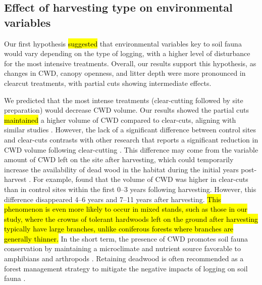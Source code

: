 \subsection*{Effect of harvesting type on environmental variables}
\label{disc:env_var}

Our first hypothesis \hl{suggested} that environmental variables key to soil fauna would vary depending on the type of logging, with a higher level of disturbance for the most intensive treatments. 
Overall, our results support this hypothesis, as changes in CWD, canopy openness, and litter depth were more pronounced in clearcut treatments, with partial cuts showing intermediate effects. 

We predicted that the most intense treatments (clear-cutting followed by site preparation) would decrease CWD volume. 
Our results showed the partial cuts \hl{maintained} a higher volume of CWD compared to clear-cuts, aligning with similar studies \citep{Nolet2018Comparingeffects,Ochs2022Responseterrestrial}. 
However, the lack of a significant difference between control sites and clear-cuts contrasts with other research that reports a significant reduction in CWD volume following clear-cutting \citep{Farnell2020effectsvariable}. 
This difference may come from the variable amount of CWD left on the site after harvesting, which could temporarily increase the availability of dead wood in the habitat during the initial years post-harvest \citep{McCarthy1994Distributionabundance,Etcheverry2005Responsesmall}. 
For example, \cite{Ochs2022Responseterrestrial} found that the volume of CWD was higher in clear-cuts than in control sites within the first 0–3 years following harvesting. 
However, this difference disappeared 4–6 years and 7–11 years after harvesting. 
\hl{This phenomenon is even more likely to occur in mixed stands, such as those in our study, where the crowns of tolerant hardwoods left on the ground after harvesting typically have large branches, unlike coniferous forests where branches are generally thinner. }
In the short term, the presence of CWD promotes soil fauna conservation by maintaining a microclimate and nutrient source favorable to amphibians and arthropods \citep{spotilaRoleTemperatureWater1972,Huhta1976Effectsclearcutting,Seibold2021contributioninsects,Ochs2022Responseterrestrial}. 
Retaining deadwood is often recommended as a forest management strategy to mitigate the negative impacts of logging on soil fauna \citep{McKenny2006Effectsstructural,Raymond-Leonard2020Deadwood}. 
